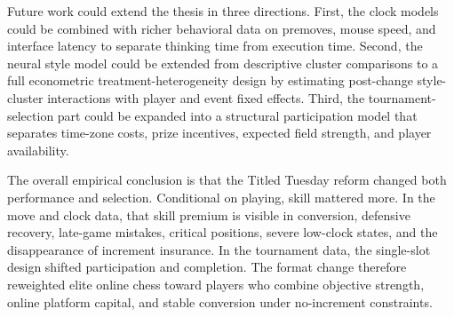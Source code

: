 Future work could extend the thesis in three directions. First, the clock models could be combined with richer behavioral data on premoves, mouse speed, and interface latency to separate thinking time from execution time. Second, the neural style model could be extended from descriptive cluster comparisons to a full econometric treatment-heterogeneity design by estimating post-change style-cluster interactions with player and event fixed effects. Third, the tournament-selection part could be expanded into a structural participation model that separates time-zone costs, prize incentives, expected field strength, and player availability.

The overall empirical conclusion is that the Titled Tuesday reform changed both performance and selection. Conditional on playing, skill mattered more. In the move and clock data, that skill premium is visible in conversion, defensive recovery, late-game mistakes, critical positions, severe low-clock states, and the disappearance of increment insurance. In the tournament data, the single-slot design shifted participation and completion. The format change therefore reweighted elite online chess toward players who combine objective strength, online platform capital, and stable conversion under no-increment constraints.
